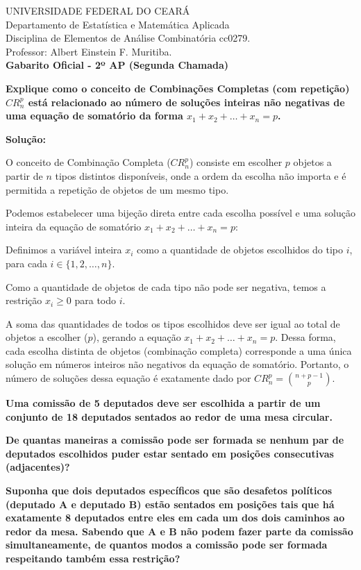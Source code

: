 \documentclass[a4paper,10pt,landscape,twocolumn]{article}  %
\let\oldenumerate\enumerate
\let\oldendenumerate\endenumerate
\renewenvironment{enumerate}{%
  \oldenumerate%
  \setlength{\itemsep}{1pt}%
  \setlength{\parskip}{0pt}%
  \setlength{\parsep}{0pt}%
  \setlength{\topsep}{2pt}%
  \setlength{\partopsep}{0pt}%
}{%
  \oldendenumerate%
}
\let\olditemize\itemize
\let\oldenditemize\enditemize
\renewenvironment{itemize}{%
  \olditemize%
  \setlength{\itemsep}{1pt}%
  \setlength{\parskip}{0pt}%
  \setlength{\parsep}{0pt}%
  \setlength{\topsep}{2pt}%
  \setlength{\partopsep}{0pt}%
}{%
  \oldenditemize%
}
\begin{document}
\footnotesize
\thispagestyle{empty}

UNIVERSIDADE FEDERAL DO CEARÁ\\
Departamento de Estatística e Matemática Aplicada\\
Disciplina de Elementos de Análise Combinatória cc0279.\\
Professor: Albert Einstein F. Muritiba.\\
\textbf{Gabarito Oficial - 2º AP (Segunda Chamada)} \\[0.2cm]

\begin{enumerate}
    \item \textbf{Explique como o conceito de Combinações Completas (com repetição) $CR_n^p$ está relacionado ao número de soluções inteiras não negativas de uma equação de somatório da forma $x_1 + x_2 + \dots + x_n = p$.}
    
    \textbf{Solução:}
    
    O conceito de Combinação Completa ($CR_n^p$) consiste em escolher $p$ objetos a partir de $n$ tipos distintos disponíveis, onde a ordem da escolha não importa e é permitida a repetição de objetos de um mesmo tipo.
    
    Podemos estabelecer uma bijeção direta entre cada escolha possível e uma solução inteira da equação de somatório $x_1 + x_2 + \dots + x_n = p$:
    \begin{itemize}
        \item Definimos a variável inteira $x_i$ como a quantidade de objetos escolhidos do tipo $i$, para cada $i \in \{1, 2, \dots, n\}$.
        \item Como a quantidade de objetos de cada tipo não pode ser negativa, temos a restrição $x_i \ge 0$ para todo $i$.
        \item A soma das quantidades de todos os tipos escolhidos deve ser igual ao total de objetos a escolher ($p$), gerando a equação $x_1 + x_2 + \dots + x_n = p$.
    \end{itemize}
    Dessa forma, cada escolha distinta de objetos (combinação completa) corresponde a uma única solução em números inteiros não negativos da equação de somatório. Portanto, o número de soluções dessa equação é exatamente dado por $CR_n^p = \binom{n+p-1}{p}$.

    \item \textbf{Uma comissão de 5 deputados deve ser escolhida a partir de um conjunto de 18 deputados sentados ao redor de uma mesa circular.}
    \begin{enumerate}
        \item \textbf{De quantas maneiras a comissão pode ser formada se nenhum par de deputados escolhidos puder estar sentado em posições consecutivas (adjacentes)?}
        \item \textbf{Suponha que dois deputados específicos que são desafetos políticos (deputado A e deputado B) estão sentados em posições tais que há exatamente 8 deputados entre eles em cada um dos dois caminhos ao redor da mesa. Sabendo que A e B não podem fazer parte da comissão simultaneamente, de quantos modos a comissão pode ser formada respeitando também essa restrição?}
    \end{enumerate}
    

\end{enumerate}
\end{document}
